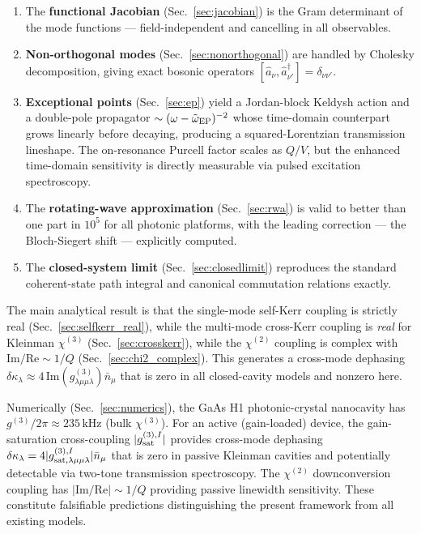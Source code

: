 \documentclass[12pt]{article}
\newcommand{\EP}{{\rm EP}}
\newcommand{\tomega}{\tilde{\omega}}
\begin{document}
\begin{enumerate}
  \item The \textbf{functional Jacobian} (Sec.~\ref{sec:jacobian}) is the
    Gram determinant of the mode functions --- field-independent and
    cancelling in all observables.

  \item \textbf{Non-orthogonal modes} (Sec.~\ref{sec:nonorthogonal}) are
    handled by Cholesky decomposition, giving exact bosonic operators
    $[\hat{a}_\nu,\hat{a}_{\nu'}^\dagger]=\delta_{\nu\nu'}$.

  \item \textbf{Exceptional points} (Sec.~\ref{sec:ep}) yield a
    Jordan-block Keldysh action and a double-pole propagator
    $\sim(\omega-\tomega_\EP)^{-2}$ whose time-domain counterpart grows
    linearly before decaying, producing a squared-Lorentzian transmission
    lineshape.  The on-resonance Purcell factor scales as $Q/V$, but the
    enhanced time-domain sensitivity is directly measurable via
    pulsed excitation spectroscopy.

  \item The \textbf{rotating-wave approximation} (Sec.~\ref{sec:rwa})
    is valid to better than one part in $10^5$ for all photonic platforms,
    with the leading correction --- the Bloch-Siegert shift --- explicitly
    computed.

  \item The \textbf{closed-system limit} (Sec.~\ref{sec:closedlimit})
    reproduces the standard coherent-state path integral and canonical
    commutation relations exactly.
\end{enumerate}

The main analytical result is that the single-mode self-Kerr coupling
is strictly real (Sec.~\ref{sec:selfkerr_real}), while the multi-mode
cross-Kerr coupling is \emph{real} for Kleinman $\chi^{(3)}$
(Sec.~\ref{sec:crosskerr}), while the $\chi^{(2)}$ coupling is complex
with $\mathrm{Im}/\mathrm{Re}\sim 1/Q$ (Sec.~\ref{sec:chi2_complex}).  This
generates a cross-mode dephasing $\delta\kappa_\lambda\approx
4\,\mathrm{Im}(g^{(3)}_{\lambda\mu\mu\lambda})\bar{n}_\mu$ that is zero
in all closed-cavity models and nonzero here.

Numerically (Sec.~\ref{sec:numerics}), the GaAs H1 photonic-crystal
nanocavity has $g^{(3)}/2\pi\approx 235\,\mathrm{kHz}$ (bulk $\chi^{(3)}$).
For an active (gain-loaded) device, the gain-saturation cross-coupling
$|g^{(3),I}_{\rm sat}|$ provides cross-mode dephasing
$\delta\kappa_\lambda = 4|g^{(3),I}_{\rm sat,\lambda\mu\mu\lambda}|\bar{n}_\mu$
that is zero in passive Kleinman cavities and potentially detectable
via two-tone transmission spectroscopy.  The $\chi^{(2)}$ downconversion coupling
has $|\mathrm{Im}/\mathrm{Re}|\sim 1/Q$ providing passive linewidth sensitivity.
These constitute falsifiable predictions distinguishing the present framework
from all existing models.
\end{document}
